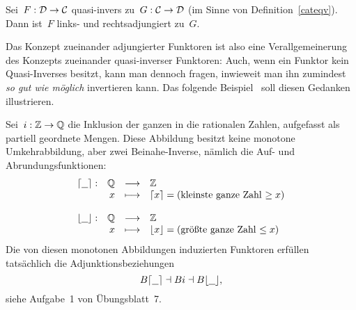 \begin{bsp}Sei~$F:\mathcal{D} \to \mathcal{C}$ quasi-invers zu~$G:\mathcal{C} \to \mathcal{D}$ (im Sinne von
Definition~\ref{cateqv}). Dann ist~$F$ links- und rechtsadjungiert
zu~$G$.\end{bsp}
Das Konzept zueinander adjungierter Funktoren ist also eine Verallgemeinerung
des Konzepts zueinander quasi-inverser Funktoren: Auch, wenn ein Funktor kein
Quasi-Inverses besitzt, kann man dennoch fragen, inwieweit man ihn zumindest
\emph{so gut wie möglich} invertieren kann. Das folgende Beispiel~\cite{smith}
soll diesen Gedanken illustrieren.

\begin{bsp}Sei~$i:\mathbb{Z} \to \mathbb{Q}$ die Inklusion der ganzen in die rationalen Zahlen,
aufgefasst als partiell geordnete Mengen. Diese Abbildung besitzt keine
monotone Umkehrabbildung, aber zwei Beinahe-Inverse, nämlich die Auf- und
Abrundungsfunktionen:
\[ \begin{array}{@{}rrcl@{}}
  \lceil \freist \rceil : & \QQ &\longrightarrow& \ZZ \\
  & x &\longmapsto& \lceil x \rceil = \text{(kleinste ganze Zahl $\geq x$)} \\\\
  \lfloor \freist \rfloor : & \QQ &\longrightarrow& \ZZ \\
  & x &\longmapsto& \lfloor x \rfloor = \text{(größte ganze Zahl $\leq x$)}
\end{array} \]
Die von diesen monotonen Abbildungen induzierten Funktoren erfüllen tatsächlich
die Adjunktionsbeziehungen
\[ B\lceil\underline{\ \ }\rceil \dashv Bi \dashv B\lfloor\underline{\ \ }\rfloor, \]
siehe Aufgabe~1 von Übungsblatt~7.\end{bsp}

